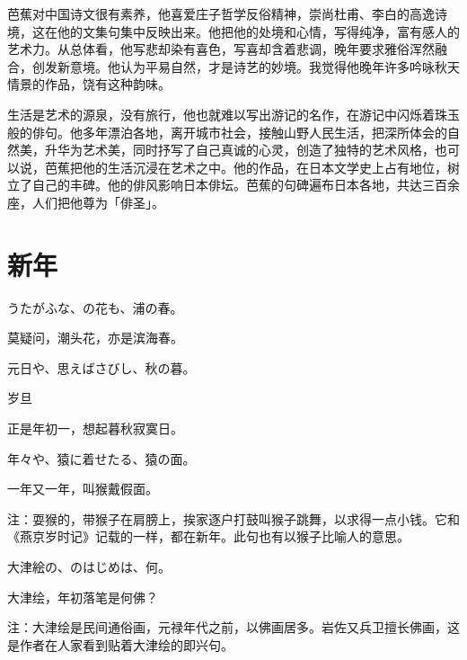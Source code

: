 {    芭蕉对中国诗文很有素养，他喜爱庄子哲学反俗精神，崇尚杜甫、李白的高逸诗境，这在他的文集句集中反映出来。他把他的处境和心情，写得纯净，富有感人的艺术力。从总体看，他写悲却染有喜色，写喜却含着悲调，晚年要求雅俗浑然融合，创发新意境。他认为平易自然，才是诗艺的妙境。我觉得他晚年许多吟咏秋天情景的作品，饶有这种韵味。

    生活是艺术的源泉，没有旅行，他也就难以写出游记的名作，在游记中闪烁着珠玉般的俳句。他多年漂泊各地，离开城市社会，接触山野人民生活，把深所体会的自然美，升华为艺术美，同时抒写了自己真诚的心灵，创造了独特的艺术风格，也可以说，芭蕉把他的生活沉浸在艺术之中。他的作品，在日本文学史上占有地位，树立了自己的丰碑。他的俳风影响日本俳坛。芭蕉的句碑遍布日本各地，共达三百余座，人们把他尊为「俳圣」。


}

\newpage

\section{\FK 新年}

\setcounter{haikucounter}{0}

\begin{haiku}
    {\FH うたがふな、の花も、浦の春。}

    {\FK 莫疑问，潮头花，亦是滨海春。}
\end{haiku}

\begin{haiku}
    {\FH 元日や、思えばさびし、秋の暮。}

    {\FK 岁旦}

    {\FK 正是年初一，想起暮秋寂寞日。}
\end{haiku}

\begin{haiku}
    {\FH 年々や、猿に着せたる、猿の面。}

    {\FK 一年又一年，叫猴戴假面。}

    {\FT 注：耍猴的，带猴子在肩膀上，挨家逐户打鼓叫猴子跳舞，以求得一点小钱。它和《燕京岁时记》记载的一样，都在新年。此句也有以猴子比喻人的意思。}
\end{haiku}

\begin{haiku}
    {\FH 大津絵の、のはじめは、何。}

    {\FK 大津绘，年初落笔是何佛？}

    {\FT 注：大津绘是民间通俗画，元禄年代之前，以佛画居多。岩佐又兵卫擅长佛画，这是作者在人家看到贴着大津绘的即兴句。}
\end{haiku}

